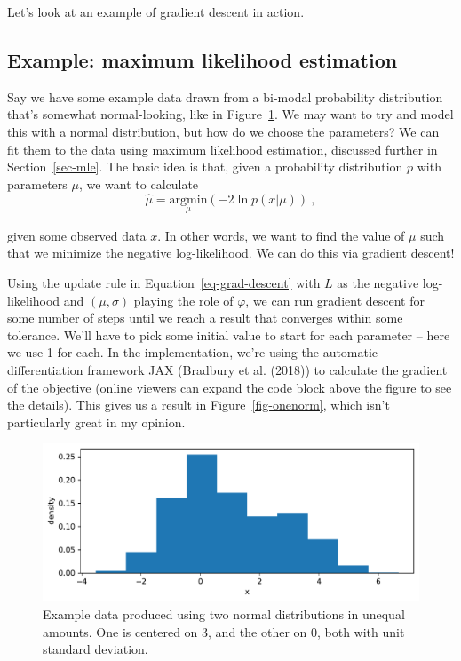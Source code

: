 \documentclass[
  11pt,
  numbers=noendperiod]{book}
\begin{document}
Let's look at an example of gradient descent in action.

\hypertarget{example-maximum-likelihood-estimation}{%
\subsection{Example: maximum likelihood
estimation}\label{example-maximum-likelihood-estimation}}

Say we have some example data drawn from a bi-modal probability
distribution that's somewhat normal-looking, like in
Figure~\ref{fig-bidata}. We may want to try and model this with a normal
distribution, but how do we choose the parameters? We can fit them to
the data using maximum likelihood estimation, discussed further in
Section~\ref{sec-mle}. The basic idea is that, given a probability
distribution \(p\) with parameters \(\mu\), we want to calculate
\[ \hat{\mu} = \underset{\mu}{\mathrm{argmin}} (-2\ln p(x|\mu))~,\]

given some observed data \(x\). In other words, we want to find the
value of \(\mu\) such that we minimize the negative log-likelihood. We
can do this via gradient descent!

Using the update rule in Equation~\ref{eq-grad-descent} with \(L\) as
the negative log-likelihood and \((\mu, \sigma)\) playing the role of
\(\varphi\), we can run gradient descent for some number of steps until
we reach a result that converges within some tolerance. We'll have to
pick some initial value to start for each parameter -- here we use 1 for
each. In the implementation, we're using the automatic differentiation
framework JAX (Bradbury et al. (2018)) to calculate the gradient of the
objective (online viewers can expand the code block above the figure to
see the details). This gives us a result in Figure~\ref{fig-onenorm},
which isn't particularly great in my opinion.

\begin{figure}

{\centering \includegraphics{./diffprog_files/figure-pdf/fig-bidata-output-1.pdf}

}

\caption{\label{fig-bidata}Example data produced using two normal
distributions in unequal amounts. One is centered on 3, and the other on
0, both with unit standard deviation.}

\end{figure}
\end{document}
